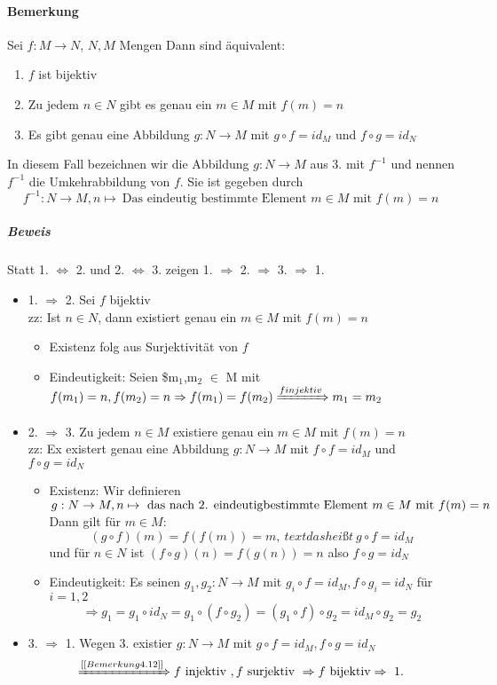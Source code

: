 \documentclass[a4paper]{scrartcl}
\theoremstyle{definition}
\theoremstyle{plain}
\theoremstyle{plain}
\theoremstyle{remark}
\theoremstyle{remark}
\theoremstyle{remark}
\begin{document}
\paragraph{Bemerkung}
\label{sec-2-6-7-6}
Sei $f:M\to N$, $N,M$ Mengen
Dann sind äquivalent:
\begin{enumerate}
\item $f$ ist bijektiv
\item Zu jedem $n\in N$ gibt es genau ein $m\in M$ mit $f(m) = n$
\item Es gibt genau eine Abbildung $g:N\to M$ mit $g\circ f = id_M$ und $f\circ g = id_N$
\end{enumerate}
In diesem Fall bezeichnen wir die Abbildung $g:N\to M$ aus 3. mit $f^{-1}$ und nennen $f^{-1}$ die Umkehrabbildung von $f$. Sie ist gegeben durch
\[f^{-1} : N\to M, n\mapsto~\text{Das eindeutig bestimmte Element $m\in M$ mit $f(m) = n$}\]
\subparagraph{Beweis}
\label{sec-2-6-7-6-1}
Statt 1. $\Leftrightarrow$ 2. und 2. $\Leftrightarrow$ 3. zeigen 1. $\Rightarrow$ 2. $\Rightarrow$ 3. $\Rightarrow$ 1.
\begin{itemize}
\item 1. $\Rightarrow$ 2. Sei $f$ bijektiv \\
        zz: Ist $n\in N$, dann existiert genau ein $m\in M$ mit $f(m) = n$ \\
\begin{itemize}
\item Existenz folg aus Surjektivität von $f$
\item Eindeutigkeit: Seien \$m$_{\text{1}}$,m$_{\text{2}}$ $\in$ M  mit \(f(m_1) = n, f(m_2) = n \Rightarrow f(m_1) = f(m_2) \xRightarrow{f injektiv} m_1 = m_2\)
\end{itemize}
\item 2. $\Rightarrow$ 3. Zu jedem $n\in M$ existiere genau ein $m\in M$ mit $f(m) = n$ \\
        zz: Ex existert genau eine Abbildung $g:N\to M$ mit $f\circ f = id_M$ und $f\circ g = id_N$
\begin{itemize}
\item Existenz: Wir definieren \(g:N\to M, n\mapsto~\text{das nach 2. eindeutig \\
		  bestimmte Element $m\in M$ mit $f(m) = n$}\) \\
Dann gilt für $m\in M$: \[(g\circ f)(m) = f(f(m)) = m,~text{das heißt}~ g\circ f = id_M\]
und für $n\in N$ ist $(f\circ g)(n) = f(g(n)) = n$ also $f\circ g = id_N$
\item Eindeutigkeit: Es seinen $g_1,g_2:N\to M$ mit $g_i \circ f = id_M, f\circ g_i = id_N$ für $i = 1,2$ \\
          \[\Rightarrow g_1 = g_1 \circ id_N = g_1 \circ (f\circ g_2) = (g_1 \circ f) \circ g_2 = id_M \circ g_2 = g_2\]
\end{itemize}
\item 3. $\Rightarrow$ 1. Wegen 3. existier $g:N\to M$ mit $g\circ f = id_M,f\circ g = id_N$ \\
        \[\xRightarrow{[[Bemerkung 4.12]]} f~\text{injektiv}~,f~\text{surjektiv}~\Rightarrow f~\text{bijektiv}\Rightarrow~\text{1.}\]
\end{itemize}
\end{document}
